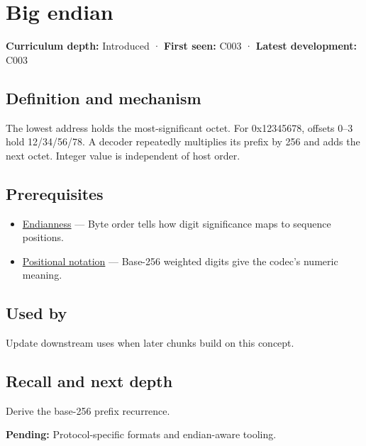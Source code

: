 \hypertarget{appendix-92e040df969a}{}
\section{Big endian}\label{appendix-92e040df969a-big-endian}

\textbf{Curriculum depth:} Introduced · \textbf{First seen:} C003 · \textbf{Latest development:} C003

\subsection{Definition and mechanism}\label{appendix-92e040df969a-definition-and-mechanism}

The lowest address holds the most-significant octet. For 0x12345678, offsets 0--3 hold 12/34/56/78. A decoder repeatedly multiplies its prefix by 256 and adds the next octet. Integer value is independent of host order.

\subsection{Prerequisites}\label{appendix-92e040df969a-prerequisites}

\begin{itemize}
\tightlist
\item
  \hyperref[appendix-bc07c3d25b18]{Endianness} --- Byte order tells how digit significance maps to sequence positions.
\item
  \hyperref[appendix-83c3f28f7bda]{Positional notation} --- Base-256 weighted digits give the codec's numeric meaning.
\end{itemize}

\subsection{Used by}\label{appendix-92e040df969a-used-by}

Update downstream uses when later chunks build on this concept.

\subsection{Recall and next depth}\label{appendix-92e040df969a-recall-and-next-depth}

Derive the base-256 prefix recurrence.

\textbf{Pending:} Protocol-specific formats and endian-aware tooling.

